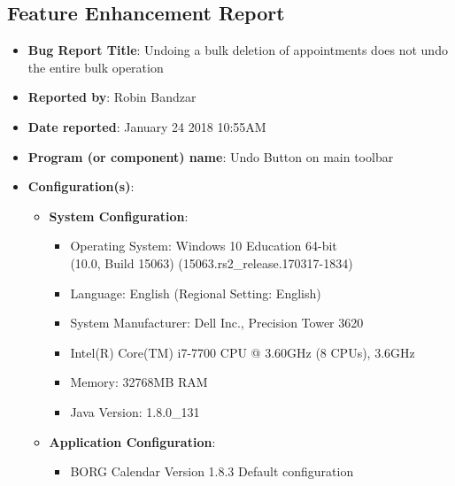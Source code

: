 \documentclass[fontsize=12pt,paper=letter,twoside]{scrartcl}
\begin{document}
\newpage
\subsection{Feature Enhancement Report}

\begin{itemize}
\item \textbf{Bug Report Title}: Undoing a bulk deletion of appointments does not undo the entire bulk operation
\item \textbf{Reported by}: Robin Bandzar
\item \textbf{Date reported}: January 24 2018 10:55AM
\item \textbf{Program (or component) name}: Undo Button on main toolbar
\item \textbf{Configuration(s)}: 
\begin{itemize}
    \item \textbf{System Configuration}:
    \begin{itemize}
        \item {Operating System: Windows 10 Education 64-bit \\ (10.0, Build 15063) (15063.rs2\_release.170317-1834)}
        \item {Language: English (Regional Setting: English)}
        \item {System Manufacturer: Dell Inc., Precision Tower 3620}
        \item {Intel(R) Core(TM) i7-7700 CPU @ 3.60GHz (8 CPUs), 3.6GHz }
        \item {Memory: 32768MB RAM}
        \item {Java Version: 1.8.0\_131}
    \end{itemize}
    \item \textbf{Application Configuration}:
    \begin{itemize}
        \item {BORG Calendar Version 1.8.3 Default configuration}
    \end{itemize}
\end{itemize}


\end{itemize}
\end{document}
